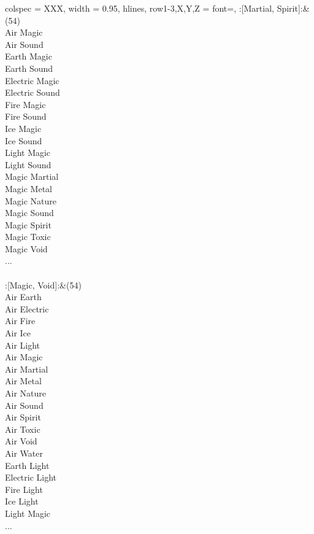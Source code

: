 \begin{longtblr}[
	caption = {2v2 Defending Weak},
	label = {2v2-Defending-Weak},
]{
	colspec = {XXX}, width = 0.95\linewidth,
	hlines,
	row{1-3,X,Y,Z} = {font=\bfseries},
}
	:[Martial, Spirit]:&{(54)\\
	Air Magic \\
	Air Sound \\
	Earth Magic \\
	Earth Sound \\
	Electric Magic \\
	Electric Sound \\
	Fire Magic \\
	Fire Sound \\
	Ice Magic \\
	Ice Sound \\
	Light Magic \\
	Light Sound \\
	Magic Martial \\
	Magic Metal \\
	Magic Nature \\
	Magic Sound \\
	Magic Spirit \\
	Magic Toxic \\
	Magic Void \\
	...\\
	}\\

	:[Magic, Void]:&{(54)\\
	Air Earth \\
	Air Electric \\
	Air Fire \\
	Air Ice \\
	Air Light \\
	Air Magic \\
	Air Martial \\
	Air Metal \\
	Air Nature \\
	Air Sound \\
	Air Spirit \\
	Air Toxic \\
	Air Void \\
	Air Water \\
	Earth Light \\
	Electric Light \\
	Fire Light \\
	Ice Light \\
	Light Magic \\
	...\\
	}\\


\end{longtblr}
